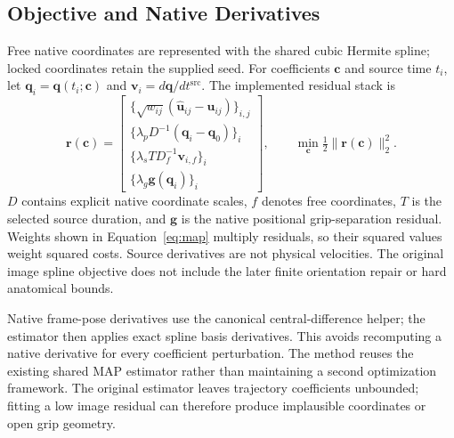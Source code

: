 \documentclass[11pt,letterpaper]{article}
\begin{document}
\subsection{Objective and Native Derivatives}
Free native coordinates are represented with the shared cubic Hermite spline;
locked coordinates retain the supplied seed. For coefficients $\mathbf c$ and
source time $t_i$, let $\mathbf q_i=\mathbf q(t_i;\mathbf c)$ and
$\mathbf v_i=d\mathbf q/dt^{\mathrm{src}}$. The implemented residual stack is
\begin{equation}\label{eq:map}
\mathbf r(\mathbf c)=
\begin{bmatrix}
 \{\sqrt{w_{ij}}(\widehat{\mathbf u}_{ij}-\mathbf u_{ij})\}_{i,j}\\
 \{\lambda_p D^{-1}(\mathbf q_i-\mathbf q_0)\}_i\\
 \{\lambda_s T D_f^{-1}\mathbf v_{i,f}\}_i\\
 \{\lambda_g\mathbf g(\mathbf q_i)\}_i
\end{bmatrix},\qquad
\min_{\mathbf c}\tfrac12\|\mathbf r(\mathbf c)\|_2^2.
\end{equation}
$D$ contains explicit native coordinate scales, $f$ denotes free coordinates,
$T$ is the selected source duration, and $\mathbf g$ is the native positional
grip-separation residual. Weights shown in Equation~\ref{eq:map} multiply
residuals, so their squared values weight squared costs. Source derivatives
are not physical velocities. The original image spline objective does not
include the later finite orientation repair or hard anatomical bounds.

Native frame-pose derivatives use the canonical central-difference helper;
the estimator then applies exact spline basis derivatives. This avoids
recomputing a native derivative for every coefficient perturbation. The method
reuses the existing shared MAP estimator rather than maintaining a second
optimization framework. The original estimator leaves trajectory coefficients
unbounded; fitting a low image residual can therefore produce implausible
coordinates or open grip geometry.
\end{document}
